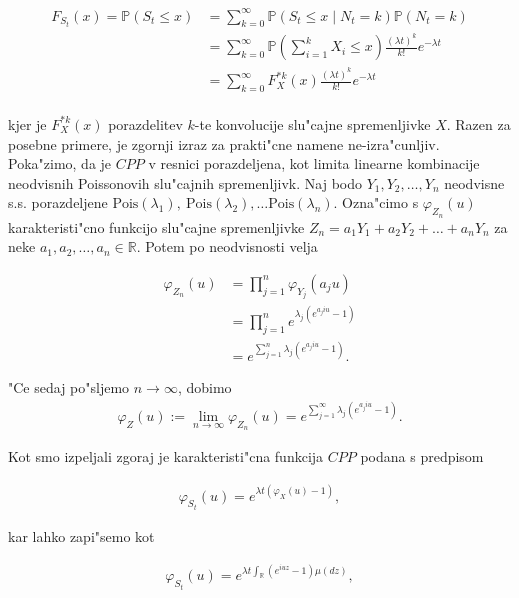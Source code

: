 \documentclass[12pt, a4paper, reqno]{amsart}
\theoremstyle{definition} %
\theoremstyle{plain} %
\newcommand{\R}{\mathbb{R}}
\newcommand{\Prob}{\mathbb{P}}
\newcommand{\1}{\mathds{1}}
\newcommand{\Pois}[1]{\text{Pois}(#1)}
\begin{document}
    \begin{align*}
        F_{S_t}(x) = \Prob(S_t \leq x) 
        &= \sum_{k=0}^\infty \Prob(S_t \leq x \mid N_t = k)\Prob(N_t = k) \\
        & = \sum_{k=0}^\infty \Prob(\sum_{i=1}^k X_i \leq x)\frac{(\lambda t)^k}{k!}e^{-\lambda t} \\
        & = \sum_{k=0}^\infty F_X^{*k}(x)\frac{(\lambda t)^k}{k!}e^{-\lambda t} \\
    \end{align*}

    \noindent
    kjer je $F_X^{*k}(x)$ porazdelitev $k$-te konvolucije slu"cajne spremenljivke $X$. Razen za 
    posebne primere, je zgornji izraz za prakti"cne namene ne-izra"cunljiv. 
    Poka"zimo, da je $CPP$ v resnici porazdeljena, kot limita linearne kombinacije neodvisnih Poissonovih
    slu"cajnih spremenljivk. Naj bodo $Y_1, Y_2, \dots, Y_n$ neodvisne s.s. porazdeljene 
    $\Pois{\lambda_1}, \ \Pois{\lambda_2}, \dots \Pois{\lambda_n}$. Ozna"cimo s $\varphi_{Z_n}(u)$ 
    karakteristi"cno funkcijo slu"cajne spremenljivke $Z_n = a_1Y_1 + a_2Y_2 + \dots + a_nY_n$ za neke 
    $a_1, a_2, \dots, a_n \in \R$.
    Potem po neodvisnosti velja


    \begin{align*}
        \varphi_{Z_n}(u) 
                &= \prod_{j=1}^{n}\varphi_{Y_j}(a_ju)\\
                &= \prod_{j=1}^{n}e^{\lambda_j\left(e^{a_j i u} - 1\right)} \\
                &= e^{\sum_{j=1}^{n}\lambda_j\left(e^{a_j i u} - 1\right)}.
    \end{align*}

    \noindent
    "Ce sedaj po"sljemo $n \to \infty$, dobimo
    \begin{align}
        \varphi_{Z}(u) := \lim_{n\to\infty}\varphi_{Z_n}(u) = e^{\sum_{j=1}^{\infty}\lambda_j\left(e^{a_j i u} - 1\right)}.
        \label{eq:karFunkcVrste}
    \end{align}

    \noindent
    Kot smo izpeljali zgoraj je karakteristi"cna funkcija $CPP$ podana s predpisom

    \begin{align*}
        \varphi_{S_t}(u) = e^{\lambda t\left(\varphi_X(u) - 1\right)}, 
    \end{align*}

    \noindent
    kar lahko zapi"semo kot 

    \begin{align*}
        \varphi_{S_t}(u) = e^{\lambda t\int_{\R}\left(e^{i u z} - 1\right) \mu(dz)},
    \end{align*}
\end{document}
